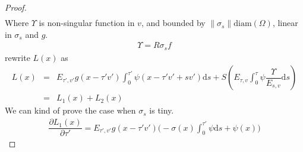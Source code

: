 \documentclass[12pt,a4paper]{article}
\begin{document}
\begin{proof}
\begin{eqnarray}
\end{eqnarray} 
Where $\Upsilon$ is non-singular function in $v$, and bounded by $\|\sigma_s\|\mathrm{diam}(\Omega)$, linear in $\sigma_s$ and $g$.
\begin{eqnarray}
\Upsilon = R\sigma_s f
\end{eqnarray}
rewrite $L(x)$ as
\begin{eqnarray}
L(x) &=& E_{\tau',v'}g(x-\tau'v')\int_0^{\tau'}\psi(x-\tau' v' + sv')\mathrm{d}s + S\left(E_{\tau,v} \int_0^{\tau}\psi\dfrac{\Upsilon}{E_{s,v}}\mathrm{d}s\right) \nonumber\\
 &=& L_1(x) + L_2(x)
\end{eqnarray}
We can kind of prove the case when $\sigma_s$ is tiny.
\begin{eqnarray}
\dfrac{\partial L_1(x)}{\partial \tau'} =E_{\tau',v'}g(x-\tau'v')\Big( -\sigma(x) \int_0^{\tau'}\psi\mathrm{d}s + \psi(x)\Big)
\end{eqnarray}
\end{proof}
\end{document}
